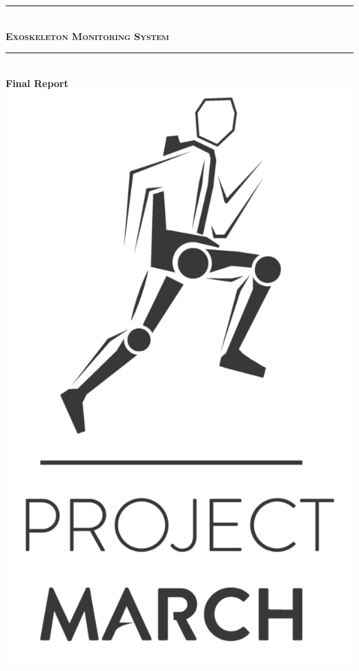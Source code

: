 \begin{titlepage}

\newcommand{\HRule}{\rule{\linewidth}{0.5mm}}
\centering

\HRule \\[0.4cm]
\textsc{ \huge \bfseries Exoskeleton Monitoring System}\\
\HRule \\[0.4cm]

{\LARGE \bfseries Final Report }\\[1.4cm]

\includegraphics[scale=0.1]{logo/Project_MARCH2}\\[1.4cm]



\end{titlepage}
